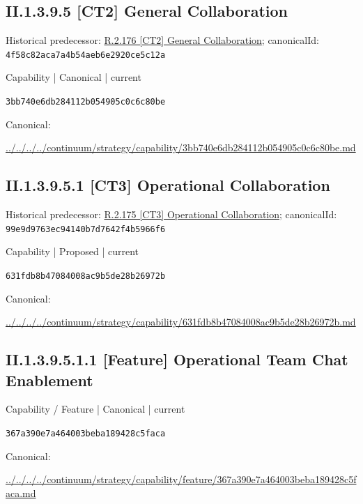 \documentclass[10pt,a4paper]{article}
\begin{document}
\subsection*{II.1.3.9.5 [CT2] General Collaboration}
Historical predecessor: \hyperref[element-4f58c82aca7a4b54aeb6e2920ce5c12a]{R.2.176 [CT2] General Collaboration}; canonicalId: \texttt{4f58c82aca7a4b54aeb6e2920ce5c12a}\par
\label{element-3bb740e6db284112b054905c0c6c80be}
{\small Capability | Canonical | current}\par
\texttt{3bb740e6db284112b054905c0c6c80be}\par
Canonical: \par
{\footnotesize\url{../../../../continuum/strategy/capability/3bb740e6db284112b054905c0c6c80be.md}}\par
\subsection*{II.1.3.9.5.1 [CT3] Operational Collaboration}
Historical predecessor: \hyperref[element-99e9d9763ec94140b7d7642f4b5966f6]{R.2.175 [CT3] Operational Collaboration}; canonicalId: \texttt{99e9d9763ec94140b7d7642f4b5966f6}\par
\label{element-631fdb8b47084008ac9b5de28b26972b}
{\small Capability | Proposed | current}\par
\texttt{631fdb8b47084008ac9b5de28b26972b}\par
Canonical: \par
{\footnotesize\url{../../../../continuum/strategy/capability/631fdb8b47084008ac9b5de28b26972b.md}}\par
\subsection*{II.1.3.9.5.1.1 [Feature] Operational Team Chat Enablement}
\label{element-367a390e7a464003beba189428c5faca}
{\small Capability / Feature | Canonical | current}\par
\texttt{367a390e7a464003beba189428c5faca}\par
Canonical: \par
{\footnotesize\url{../../../../continuum/strategy/capability/feature/367a390e7a464003beba189428c5faca.md}}\par
\end{document}
